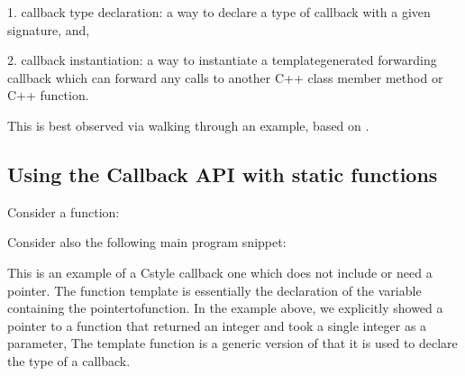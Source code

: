 \documentclass[letterpaper,10pt,english]{sphinxmanual}
\renewcommand{\sphinxcode}[1]{\texttt{\small{#1}}}
\begin{document}
1. callback type declaration: a way to declare a type of callback
with a given signature, and,

2. callback instantiation: a way to instantiate a
template\sphinxhyphen{}generated forwarding callback which can forward any calls
to another C++ class member method or C++ function.

This is best observed via walking through an example, based on
\sphinxcode{\sphinxupquote{samples/main\sphinxhyphen{}callback.cc}}.


\subsection{Using the Callback API with static functions}
\label{\detokenize{callbacks:using-the-callback-api-with-static-functions}}
Consider a function:

\begin{sphinxVerbatim}[commandchars=\\\{\}]
 
    
            
   
\end{sphinxVerbatim}

Consider also the following main program snippet:

\begin{sphinxVerbatim}[commandchars=\\\{\}]
     \PYG{p}{[}\PYG{p}{]}
     
\end{sphinxVerbatim}

This is an example of a C\sphinxhyphen{}style callback \textendash{} one which does not include or need
a \sphinxcode{} pointer.  The function template \sphinxcode{} is essentially the
declaration of the variable containing the pointer\sphinxhyphen{}to\sphinxhyphen{}function.  In the example
above, we explicitly showed a pointer to a function that returned an integer and
took a single integer as a parameter,  The \sphinxcode{} template function is
a generic version of that \textendash{} it is used to declare the type of a callback.
\end{document}
